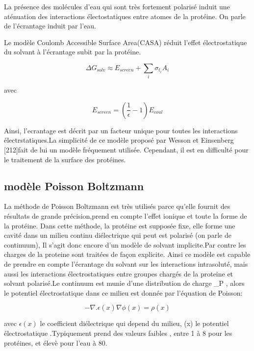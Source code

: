 La présence des molécules d'eau qui sont très fortement polarisé induit une aténuation des interactions électostatiques entre atomes de la protéine. On parle de l'écrantage induit par l'eau.


Le modèle \og Coulomb Accessible Surface Area\fg (CASA) réduit l'effet électrostatique du solvant à l'écrantage subit par la protéine. 

\begin{equation}
\Delta G_{solv} \approx E_{screen} + \sum_i \sigma_{t_i} A_i
\end{equation}

avec 

\begin{equation}
E_{screen} =  (\frac{1}{\epsilon} -1 )E_{coul}
\end{equation}

Ainsi, l'ecrantage est décrit par un facteur unique pour toutes les interactions électrstatiques.La simplicité de ce modèle proposé par Wesson et Einsenberg [212]fait de lui un modèle fréquement utilisée. Cependant, il est en difficulté pour le traitement de la surface des protéines.

\subsection{modèle Poisson Boltzmann}
La méthode de Poisson Boltzmann est très utilisés parce qu'elle fournit des résultats de grande précision,prend en compte l'effet ionique et toute la forme de la protéine. Dans cette méthode, la protéine est supposée fixe, elle forme une cavité dans un milieu continu diélectrique qui peut est polarisé (on parle de continuum), Il s'agit donc encore d'un modèle de solvant implicite.Par contre les charges de la  proteine sont traitées de façon explicite. Ainsi ce modèle est capable de prendre en compte l'écrantage du solvant sur les interactions intrasoluté, mais aussi les interactions électrostatiques entre groupes chargés  de la proteine et solvant polarisé.Le continuum est munie d'une distribution de charge \rho_P , alors le potentiel électrostatique dans ce milieu est donnée par l'équation de Poisson:

\begin{equation}
  -\nabla . \epsilon(x)\nabla \phi(x) = \rho(x)  
\end{equation}

avec $\epsilon(x)$ le coefficient diélectrique qui depend du milieu, \phi (x) le potentiel électrostatique .Typiquement \epsilon prend des valeurs faibles , entre 1 à 8 pour les protéines, et élevè pour l'eau à 80.


